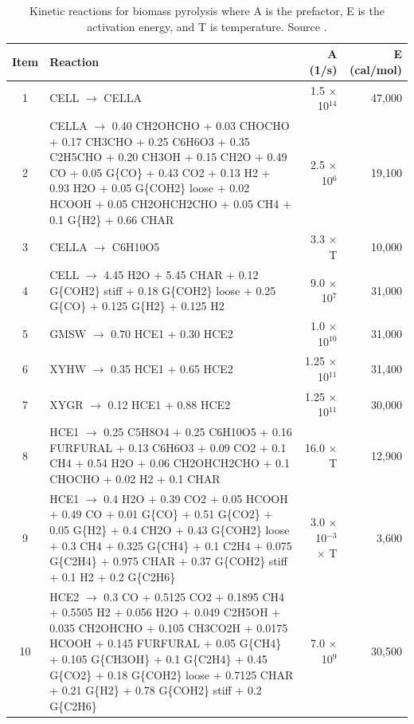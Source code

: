 \documentclass[12pt,titlepage]{article}
\begin{document}
\begin{center}
\footnotesize
\begin{longtable}{cp{4in}rr}
    \caption{Kinetic reactions for biomass pyrolysis where A is the prefactor, E is the activation energy, and T is temperature. Source \cite{Debiagi-2018}.}
    \label{tab:chem-kinetics} \\
    \toprule
    Item & Reaction & A (1/s) & E (cal/mol) \\
    \midrule
    1  & CELL $\rightarrow$ CELLA & 1.5 $\times$ 10$^{14}$ & 47,000 \\
    2  & CELLA $\rightarrow$ 0.40 CH2OHCHO + 0.03 CHOCHO + 0.17 CH3CHO + 0.25 C6H6O3 + 0.35 C2H5CHO + 0.20 CH3OH + 0.15 CH2O + 0.49 CO + 0.05 G\{CO\} + 0.43 CO2 + 0.13 H2 + 0.93 H2O + 0.05 G\{COH2\} loose + 0.02 HCOOH + 0.05 CH2OHCH2CHO + 0.05 CH4 + 0.1 G\{H2\} + 0.66 CHAR & 2.5 $\times$ 10$^6$ & 19,100 \\
    3  & CELLA $\rightarrow$ C6H10O5 & 3.3 $\times$ T & 10,000 \\
    4  & CELL $\rightarrow$ 4.45 H2O + 5.45 CHAR + 0.12 G\{COH2\} stiff + 0.18 G\{COH2\} loose + 0.25 G\{CO\} + 0.125 G\{H2\} + 0.125 H2 & 9.0 $\times$ 10$^7$ & 31,000 \\
    5  & GMSW $\rightarrow$ 0.70 HCE1 + 0.30 HCE2 & 1.0 $\times$ 10$^{10}$ & 31,000 \\
    6  & XYHW $\rightarrow$ 0.35 HCE1 + 0.65 HCE2 & 1.25 $\times$ 10$^{11}$ & 31,400 \\
    7  & XYGR $\rightarrow$ 0.12 HCE1 + 0.88 HCE2 & 1.25 $\times$ 10$^{11}$ & 30,000 \\
    8  & HCE1 $\rightarrow$ 0.25 C5H8O4 + 0.25 C6H10O5 + 0.16 FURFURAL + 0.13 C6H6O3 + 0.09 CO2 + 0.1 CH4 + 0.54 H2O + 0.06 CH2OHCH2CHO + 0.1 CHOCHO + 0.02 H2 + 0.1 CHAR & 16.0 $\times$ T & 12,900 \\
    9  & HCE1 $\rightarrow$ 0.4 H2O + 0.39 CO2 + 0.05 HCOOH + 0.49 CO + 0.01 G\{CO\} + 0.51 G\{CO2\} + 0.05 G\{H2\} + 0.4 CH2O + 0.43 G\{COH2\} loose + 0.3 CH4 + 0.325 G\{CH4\} + 0.1 C2H4 + 0.075 G\{C2H4\} + 0.975 CHAR + 0.37 G\{COH2\} stiff + 0.1 H2 + 0.2 G\{C2H6\} & 3.0 $\times$ 10$^{-3}$ $\times$ T & 3,600 \\
    10 & HCE2 $\rightarrow$ 0.3 CO + 0.5125 CO2 + 0.1895 CH4 + 0.5505 H2 + 0.056 H2O + 0.049 C2H5OH + 0.035 CH2OHCHO + 0.105 CH3CO2H + 0.0175 HCOOH + 0.145 FURFURAL + 0.05 G\{CH4\} + 0.105 G\{CH3OH\} + 0.1 G\{C2H4\} + 0.45 G\{CO2\} + 0.18 G\{COH2\} loose + 0.7125 CHAR + 0.21 G\{H2\} + 0.78 G\{COH2\} stiff + 0.2 G\{C2H6\} & 7.0 $\times$ 10$^9$ & 30,500 \\

\end{longtable}
\end{center}
\end{document}
